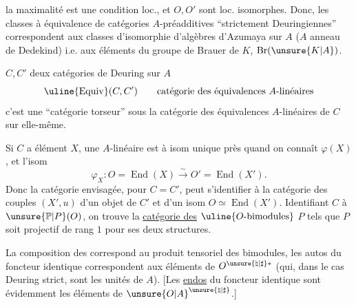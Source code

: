 la maximalité est une condition loc., et $O,O'$ sont loc. isomorphes. Donc, les classes  à équivalence  de catégories $A$-préadditives ``strictement Deuringiennes'' correspondent aux classes d'isomorphie d'algèbres d'Azumaya  sur $A$ ($A$ anneau de Dedekind) i.e. aux éléments du groupe de Brauer de $K$, $\operatorname{Br}(\unsure{K|A})$.

$C,C'$ deux catégories de Deuring sur $A$
\[
\uline{\operatorname{Equiv}}(C,C')\qquad\text{catégorie des équivalences }A\text{-linéaires}
\]
 c'est une  ``catégorie torseur'' sous la catégorie des équivalences $A$-linéaires de $C$ sur elle-même.

Si $C$ a élément $X$, une   $A$-linéaire \deleted{\unsure{\varphi}}  est  à isom unique près quand on connaît  $\varphi(X)$, et l'isom
\[
\varphi_X:O=\operatorname{End}(X)\xrightarrow{\sim}O'=\operatorname{End}(X').
\]
Donc la catégorie envisagée, pour $C=C'$, peut s'identifier à la catégorie des couples $(X',u)$ d'un objet de $C'$ et d'un isom  $O\simeq\operatorname{End}(X')$.
Identifiant $C$ à $\unsure{\mathbb P|P}(O)$, on trouve la \uline{catégorie des} $\uline{O\text{-bimodules}}$ $P$ tels que $P$ soit projectif de rang $1$ pour ses deux structures.

La composition des   correspond au produit tensoriel des bimodules, les autos du foncteur identique correspondent aux éléments de $O^{\unsure{\natural|\sharp}*}$ (qui, dans le cas Deuring strict, sont les unités de $A$). [Les \uline{endos} du foncteur identique sont évidemment les éléments de $\unsure{O|A}^{\unsure{\natural|\sharp}}$.]
